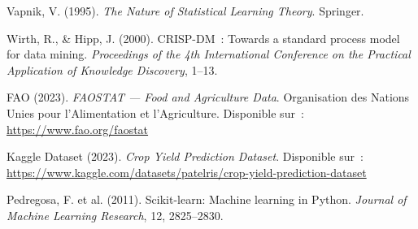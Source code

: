 \begin{enumerate}[label={[\arabic*]}, leftmargin=1.5cm, itemsep=5pt]
  \item Vapnik, V. (1995). \textit{The Nature of Statistical Learning Theory}. Springer.

  \item Wirth, R., \& Hipp, J. (2000). CRISP-DM~: Towards a standard process model for data mining. \textit{Proceedings of the 4th International Conference on the Practical Application of Knowledge Discovery}, 1--13.

  \item FAO (2023). \textit{FAOSTAT --- Food and Agriculture Data}. Organisation des Nations Unies pour l'Alimentation et l'Agriculture. Disponible sur~: \url{https://www.fao.org/faostat}

  \item Kaggle Dataset (2023). \textit{Crop Yield Prediction Dataset}. Disponible sur~: \url{https://www.kaggle.com/datasets/patelris/crop-yield-prediction-dataset}

  \item Pedregosa, F. et al. (2011). Scikit-learn: Machine learning in Python. \textit{Journal of Machine Learning Research}, 12, 2825--2830.

\end{enumerate}

\newpage
